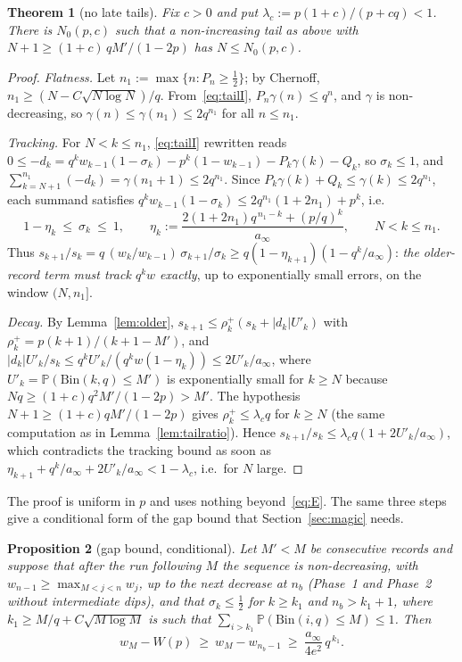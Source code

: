 \documentclass[11pt]{article}
\newtheorem{theorem}{Theorem}[section]
\newtheorem{proposition}[theorem]{Proposition}
\theoremstyle{definition}
\newcommand{\Bin}{\mathrm{Bin}}
\newcommand{\Prob}{\mathbb{P}}
\begin{document}
\begin{theorem}[no late tails]\label{thm:notail}
  Fix $c>0$ and put $\lambda_c:=p(1+c)/(p+cq)<1$.  There is
  $N_0(p,c)$ such that a non-increasing tail as above with
  $N+1\ge(1+c)\,qM'/(1-2p)$ has $N\le N_0(p,c)$.
\end{theorem}

\begin{proof}
  \emph{Flatness.}  Let $n_1:=\max\{n:P_n\ge\tfrac12\}$; by Chernoff,
  $n_1\ge(N-C\sqrt{N\log N})/q$.  From~\eqref{eq:tailI},
  $P_n\gamma(n)\le q^n$, and $\gamma$ is non-decreasing, so
  $\gamma(n)\le\gamma(n_1)\le2q^{n_1}$ for all $n\le n_1$.

  \emph{Tracking.}  For $N<k\le n_1$, \eqref{eq:tailI} rewritten reads
  $0\le-d_k=q^kw_{k-1}(1-\sigma_k)-p^k(1-w_{k-1})-P_k\gamma(k)-Q_k$,
  so $\sigma_k\le1$, and $\sum_{k=N+1}^{n_1}(-d_k)=\gamma(n_1+1)\le2q^{n_1}$.
  Since $P_k\gamma(k)+Q_k\le\gamma(k)\le2q^{n_1}$, each summand
  satisfies $q^kw_{k-1}(1-\sigma_k)\le2q^{n_1}(1+2n_1)+p^k$, i.e.
  \[
    1-\eta_k\ \le\ \sigma_k\ \le\ 1,\qquad
    \eta_k:=\frac{2(1+2n_1)q^{\,n_1-k}+(p/q)^k}{a_\infty},
    \qquad N<k\le n_1 .
  \]
  Thus $s_{k+1}/s_k=q\,(w_k/w_{k-1})\,\sigma_{k+1}/\sigma_k\ge q(1-\eta_{k+1})(1-q^k/a_\infty)$:
  \emph{the older-record term must track $q^kw$ exactly}, up to
  exponentially small errors, on the window $(N,n_1]$.

  \emph{Decay.}  By Lemma~\ref{lem:older}, $s_{k+1}\le\rho^+_k(s_k+|d_k|U'_k)$
  with $\rho^+_k=p(k+1)/(k+1-M')$, and $|d_k|U'_k/s_k\le q^kU'_k/(q^kw(1-\eta_k))\le2U'_k/a_\infty$,
  where $U'_k=\Prob(\Bin(k,q)\le M')$ is exponentially small for
  $k\ge N$ because $Nq\ge(1+c)q^2M'/(1-2p)>M'$.  The hypothesis
  $N+1\ge(1+c)qM'/(1-2p)$ gives $\rho^+_k\le\lambda_cq$ for $k\ge N$
  (the same computation as in Lemma~\ref{lem:tailratio}).  Hence
  $s_{k+1}/s_k\le\lambda_cq(1+2U'_k/a_\infty)$, which contradicts the
  tracking bound as soon as $\eta_{k+1}+q^k/a_\infty+2U'_k/a_\infty<1-\lambda_c$,
  i.e.\ for $N$ large.
\end{proof}

The proof is uniform in $p$ and uses nothing beyond~\eqref{eq:E}.
The same three steps give a conditional form of the gap bound that
Section~\ref{sec:magic} needs.

\begin{proposition}[gap bound, conditional]\label{prop:gap}
  Let $M'<M$ be consecutive records and suppose that after the run
  following $M$ the sequence is non-decreasing, with
  $w_{n-1}\ge\max_{M<j<n}w_j$, up to the next decrease at $n_b$
  (Phase~1 and Phase~2 without intermediate dips), and that
  $\sigma_k\le\tfrac12$ for $k\ge k_1$ and $n_b>k_1+1$, where
  $k_1\ge M/q+C\sqrt{M\log M}$ is such that $\sum_{i>k_1}\Prob(\Bin(i,q)\le M)\le1$.
  Then
  \[
    w_M-W(p)\ \ge\ w_M-w_{n_b-1}\ \ge\ \frac{a_\infty}{4e^{2}}\,q^{\,k_1}.
  \]
\end{proposition}
\end{document}
